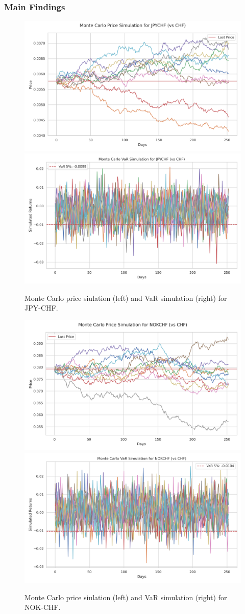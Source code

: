 \documentclass[10pt]{beamer}
\begin{document}
\begin{frame}
\frametitle{Main Findings}
\begin{figure}
    \centering  \includegraphics[width=0.48\linewidth]{reports/figures/monte_carlo_price_simulation_JPYCHF_vs_CHF.png}  \label{fig:monte_carlo_price_simulation_JPYCHF_vs_CHF}
    \includegraphics[width=0.48\linewidth]{reports/figures/monte_carlo_var_simulation_JPYCHF_vs_CHF.png}  \label{fig:monte_carlo_var_simulation_JPYCHF_vs_CHF}
    \caption{\footnotesize Monte Carlo price siulation (left) and VaR simulation (right) for JPY-CHF.}
\end{figure}
\begin{figure}
    \centering   \includegraphics[width=0.48\linewidth]{reports/figures/monte_carlo_price_simulation_NOKCHF_vs_CHF.png} \label{fig:monte_carlo_price_simulation_NOKCHF_vs_CHF}
    \includegraphics[width=0.48\linewidth]{reports/figures/monte_carlo_var_simulation_NOKCHF_vs_CHF.png} \label{fig:monte_carlo_var_simulation_NOKCHF_vs_CHF}
    \caption{\footnotesize Monte Carlo price siulation (left) and VaR simulation (right) for NOK-CHF.}
\end{figure}
\end{frame}
\end{document}
